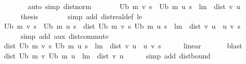 \begin{isabellebody}
\ \ \ \ \ \ \isamarkupfalse%
\ {\isacharparenleft}{\kern0pt}auto\ simp{\isacharcolon}{\kern0pt}\ dist{\isacharunderscore}{\kern0pt}norm{\isacharparenright}{\kern0pt}\isanewline
\ \ \ \ \isamarkupfalse%
\ \isamarkupfalse%
\ {\isachardoublequoteopen}U\isactrlsub b\ m\ v\ s\ {\isacharminus}{\kern0pt}\ U\isactrlsub b\ m\ u\ s\ {\isasymle}\ l{\isacharcircum}{\kern0pt}m\ {\isacharasterisk}{\kern0pt}\ dist\ v\ u{\isachardoublequoteclose}\ \isacommand{{\isachardot}{\kern0pt}}\isamarkupfalse%
\isanewline
\ \ \ \ \isamarkupfalse%
\ {\isacharquery}{\kern0pt}thesis\isanewline
\ \ \ \ \ \ \isamarkupfalse%
\ {\isacharparenleft}{\kern0pt}simp\ add{\isacharcolon}{\kern0pt}\ dist{\isacharunderscore}{\kern0pt}real{\isacharunderscore}{\kern0pt}def\ le{\isacharparenright}{\kern0pt}\isanewline
\ \ \isamarkupfalse%
\isanewline
\ \ \isamarkupfalse%
\ \isamarkupfalse%
\ {\isachardoublequoteopen}U\isactrlsub b\ m\ v\ s\ {\isasymle}\ U\isactrlsub b\ m\ u\ s\ {\isasymLongrightarrow}\ dist\ {\isacharparenleft}{\kern0pt}U\isactrlsub b\ m\ v\ s{\isacharparenright}{\kern0pt}\ {\isacharparenleft}{\kern0pt}U\isactrlsub b\ m\ u\ s{\isacharparenright}{\kern0pt}\ {\isasymle}\ l{\isacharcircum}{\kern0pt}m\ {\isacharasterisk}{\kern0pt}\ dist\ v\ u{\isachardoublequoteclose}\ \ u\ v\ s\isanewline
\ \ \ \ \isamarkupfalse%
\ {\isacharparenleft}{\kern0pt}simp\ add{\isacharcolon}{\kern0pt}\ aux\ dist{\isacharunderscore}{\kern0pt}commute{\isacharparenright}{\kern0pt}\isanewline
\ \ \isamarkupfalse%
\ \isamarkupfalse%
\ {\isachardoublequoteopen}dist\ {\isacharparenleft}{\kern0pt}U\isactrlsub b\ m\ v\ s{\isacharparenright}{\kern0pt}\ {\isacharparenleft}{\kern0pt}U\isactrlsub b\ m\ u\ s{\isacharparenright}{\kern0pt}\ {\isasymle}\ l{\isacharcircum}{\kern0pt}m\ {\isacharasterisk}{\kern0pt}\ dist\ v\ u{\isachardoublequoteclose}\ \ u\ v\ s\isanewline
\ \ \ \ \isamarkupfalse%
\ linear\ \isanewline
\ \ \ \ \isamarkupfalse%
\ blast\isanewline
\ \ \isamarkupfalse%
\ {\isachardoublequoteopen}dist\ {\isacharparenleft}{\kern0pt}U\isactrlsub b\ m\ v{\isacharparenright}{\kern0pt}\ {\isacharparenleft}{\kern0pt}U\isactrlsub b\ m\ u{\isacharparenright}{\kern0pt}\ {\isasymle}\ l{\isacharcircum}{\kern0pt}m\ {\isacharasterisk}{\kern0pt}\ dist\ v\ u{\isachardoublequoteclose}\isanewline
\ \ \ \ \isamarkupfalse%
\ {\isacharparenleft}{\kern0pt}simp\ add{\isacharcolon}{\kern0pt}\ dist{\isacharunderscore}{\kern0pt}bound{\isacharparenright}{\kern0pt}\isanewline

\end{isabellebody}
